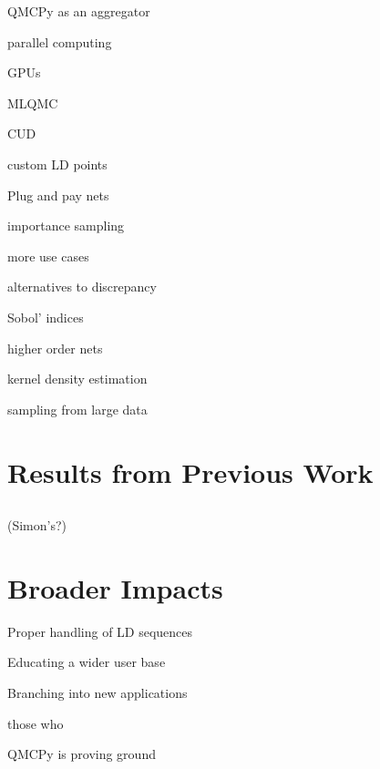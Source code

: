 \documentclass[11pt]{NSFamsart}
\begin{document}
QMCPy as an aggregator

parallel computing

GPUs

MLQMC

CUD

custom LD points

Plug and pay nets

importance sampling

more use cases

alternatives to discrepancy

Sobol' indices

higher order nets


kernel density estimation

sampling from large data


\section{Results from Previous Work} \label{sec:prevwork}

\subsection{}

(Simon's?)

\section{Broader Impacts}

Proper handling of LD sequences 

Educating a wider user base

Branching into new applications

those who

QMCPy is proving ground


\newpage
\clearpage
\setcounter{page}{1}




{\renewcommand\addcontentsline[3]{} 
\renewcommand{\refname}{{\Large\textbf{References Cited}}}                   %
\renewcommand{\bibliofont}{\normalsize}

}
\end{document}
